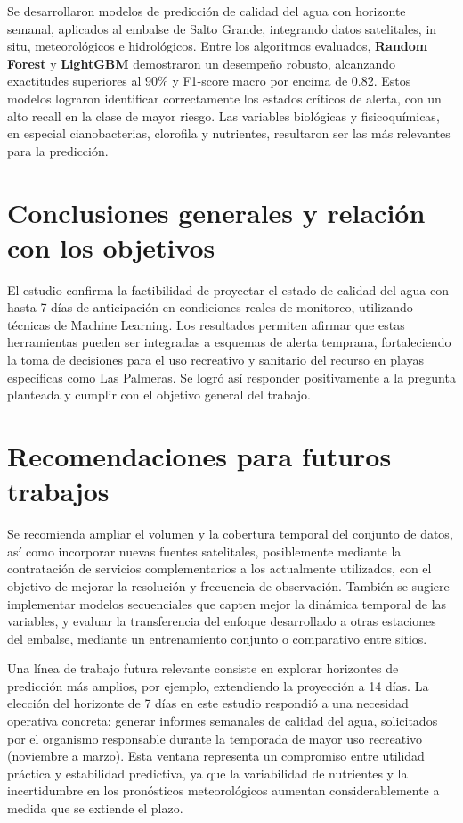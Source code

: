 \documentclass[
  11pt,
  pdftitle=TFI - Tschopp Joaquín S.,
  pdfauthor=Tschopp Joaquín S.,
  pdfcreator=LaTeX with hyperref,
]{report}  %
\begin{document}
Se desarrollaron modelos de predicción de calidad del agua con horizonte semanal, aplicados al embalse de Salto Grande, integrando datos satelitales, in situ, meteorológicos e hidrológicos. Entre los algoritmos evaluados, \textbf{Random Forest} y \textbf{LightGBM} demostraron un desempeño robusto, alcanzando exactitudes superiores al 90\% y F1-score macro por encima de 0.82. Estos modelos lograron identificar correctamente los estados críticos de alerta, con un alto recall en la clase de mayor riesgo. Las variables biológicas y fisicoquímicas, en especial cianobacterias, clorofila y nutrientes, resultaron ser las más relevantes para la predicción.

\section{Conclusiones generales y relación con los objetivos}

El estudio confirma la factibilidad de proyectar el estado de calidad del agua con hasta 7 días de anticipación en condiciones reales de monitoreo, utilizando técnicas de Machine Learning. Los resultados permiten afirmar que estas herramientas pueden ser integradas a esquemas de alerta temprana, fortaleciendo la toma de decisiones para el uso recreativo y sanitario del recurso en playas específicas como Las Palmeras. Se logró así responder positivamente a la pregunta planteada y cumplir con el objetivo general del trabajo.

\section{Recomendaciones para futuros trabajos}

Se recomienda ampliar el volumen y la cobertura temporal del conjunto de datos, así como incorporar nuevas fuentes satelitales, posiblemente mediante la contratación de servicios complementarios a los actualmente utilizados, con el objetivo de mejorar la resolución y frecuencia de observación. También se sugiere implementar modelos secuenciales que capten mejor la dinámica temporal de las variables, y evaluar la transferencia del enfoque desarrollado a otras estaciones del embalse, mediante un entrenamiento conjunto o comparativo entre sitios.

Una línea de trabajo futura relevante consiste en explorar horizontes de predicción más amplios, por ejemplo, extendiendo la proyección a 14 días. La elección del horizonte de 7 días en este estudio respondió a una necesidad operativa concreta: generar informes semanales de calidad del agua, solicitados por el organismo responsable durante la temporada de mayor uso recreativo (noviembre a marzo). Esta ventana representa un compromiso entre utilidad práctica y estabilidad predictiva, ya que la variabilidad de nutrientes y la incertidumbre en los pronósticos meteorológicos aumentan considerablemente a medida que se extiende el plazo.
\end{document}
